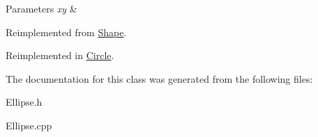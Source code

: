 \begin{DoxyParams}{Parameters}
{\em xy} & \\
\hline
\end{DoxyParams}


Reimplemented from \hyperlink{class_shape_a26d57a0589b0fd7ff03a4b5ad8dc530a}{Shape}.



Reimplemented in \hyperlink{class_circle_a5f02de3ad7e992a689b9f9e88643076c}{Circle}.



The documentation for this class was generated from the following files\+:\begin{DoxyCompactItemize}
\item 
Ellipse.\+h\item 
Ellipse.\+cpp\end{DoxyCompactItemize}
